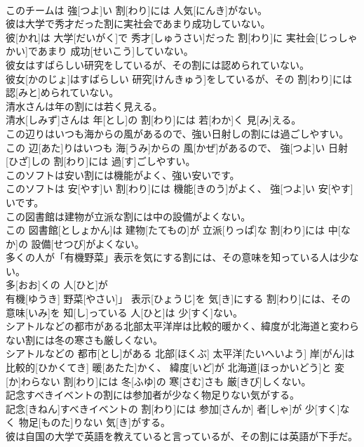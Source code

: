 \documentclass[8pt]{extreport}
\begin{document}
\begin{CJK}{UTF8}{min}
\\	このチームは 強[つよ]い 割[わり]には 人気[にんき]がない。
\\	彼は大学で秀才だった割に実社会であまり成功していない。	
\\	彼[かれ]は 大学[だいがく]で 秀才[しゅうさい]だった 割[わり]に 実社会[じっしゃかい]であまり 成功[せいこう]していない。
\\	彼女はすばらしい研究をしているが、その割には認められていない。	
\\	彼女[かのじょ]はすばらしい 研究[けんきゅう]をしているが、その 割[わり]には 認[みと]められていない。
\\	清水さんは年の割には若く見える。	
\\	清水[しみず]さんは 年[とし]の 割[わり]には 若[わか]く 見[み]える。
\\	この辺りはいつも海からの風があるので、強い日射しの割には過ごしやすい。	
\\	この 辺[あた]りはいつも 海[うみ]からの 風[かぜ]があるので、 強[つよ]い 日射[ひざ]しの 割[わり]には 過[す]ごしやすい。
\\	このソフトは安い割には機能がよく、強い安いです。	
\\	このソフトは 安[やす]い 割[わり]には 機能[きのう]がよく、 強[つよ]い 安[やす]いです。
\\	この図書館は建物が立派な割には中の設備がよくない。	
\\	この 図書館[としょかん]は 建物[たてもの]が 立派[りっぱ]な 割[わり]には 中[なか]の 設備[せつび]がよくない。
\\	多くの人が「有機野菜」表示を気にする割には、その意味を知っている人は少ない。	
\\	多[おお]くの 人[ひと]が
\\	有機[ゆうき] 野菜[やさい]」 表示[ひょうじ]を 気[き]にする 割[わり]には、その 意味[いみ]を 知[し]っている 人[ひと]は 少[すく]ない。
\\	シアトルなどの都市がある北部太平洋岸は比較的暖かく、緯度が北海道と変わらない割には冬の寒さも厳しくない。	
\\	シアトルなどの 都市[とし]がある 北部[ほくぶ] 太平洋[たいへいよう] 岸[がん]は 比較的[ひかくてき] 暖[あたた]かく、 緯度[いど]が 北海道[ほっかいどう]と 変[か]わらない 割[わり]には 冬[ふゆ]の 寒[さむ]さも 厳[きび]しくない。
\\	記念すべきイベントの割には参加者が少なく物足りない気がする。	
\\	記念[きねん]すべきイベントの 割[わり]には 参加[さんか] 者[しゃ]が 少[すく]なく 物足[ものた]りない 気[き]がする。
\\	彼は自国の大学で英語を教えていると言っているが、その割には英語が下手だ。	

\end{CJK}
\end{document}
